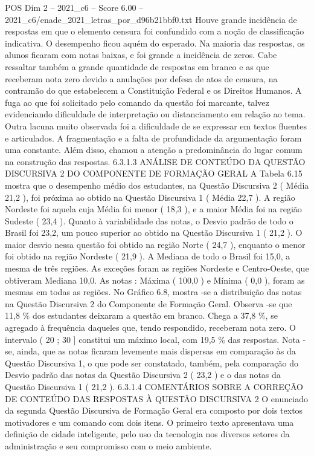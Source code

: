 \begin{textsample}{POS Dim 2 – 2021\_c6 – Score 6.00 – 2021\_c6/enade\_2021\_letras\_por\_d96b21bbf0.txt}
Houve grande incidência de respostas em que o elemento censura foi confundido com a noção de classificação indicativa.
O desempenho ficou aquém do esperado.
Na maioria das respostas, os alunos ficaram com notas baixas, e foi grande a incidência de zeros.
Cabe ressaltar também a grande quantidade de respostas em branco e as que receberam nota zero devido a anulações por defesa de atos de censura, na contramão do que estabelecem a Constituição Federal e os Direitos Humanos.
A fuga ao que foi solicitado pelo comando da questão foi marcante, talvez evidenciando dificuldade de interpretação ou distanciamento em relação ao tema.
Outra lacuna muito observada foi a dificuldade de se expressar em textos fluentes e articulados.
A fragmentação e a falta de profundidade da argumentação foram uma constante.
Além disso, chamou a atenção a predominância do lugar comum na construção das respostas. 6.3.1.3 ANÁLISE DE CONTEÚDO DA QUESTÃO DISCURSIVA 2 DO COMPONENTE DE FORMAÇÃO GERAL A Tabela 6.15 mostra que o desempenho médio dos estudantes, na Questão Discursiva 2 ( Média 21,2 ), foi próxima ao obtido na Questão Discursiva 1 ( Média 22,7 ).
A região Nordeste foi aquela cuja Média foi menor ( 18,3 ), e a maior Média foi na região Sudeste ( 23,4 ).
Quanto à variabilidade das notas, o Desvio padrão de todo o Brasil foi 23,2, um pouco superior ao obtido na Questão Discursiva 1 ( 21,2 ).
O maior desvio nessa questão foi obtido na região Norte ( 24,7 ), enquanto o menor foi obtido na região Nordeste ( 21,9 ).
A Mediana de todo o Brasil foi 15,0, a mesma de três regiões.
As exceções foram as regiões Nordeste e Centro-Oeste, que obtiveram Mediana 10,0.
As notas : Máxima ( 100,0 ) e Mínima ( 0,0 ), foram as mesmas em todas as regiões.
No Gráfico 6.8, mostra -se a distribuição das notas na Questão Discursiva 2 do Componente de Formação Geral.
Observa -se que 11,8 \% dos estudantes deixaram a questão em branco.
Chega a 37,8 \%, se agregado à frequência daqueles que, tendo respondido, receberam nota zero.
O intervalo ( 20 ; 30 ] constitui um máximo local, com 19,5 \% das respostas.
Nota -se, ainda, que as notas ficaram levemente mais dispersas em comparação às da Questão Discursiva 1, o que pode ser constatado, também, pela comparação do Desvio padrão das notas da Questão Discursiva 2 ( 23,2 ) e o das notas da Questão Discursiva 1 ( 21,2 ). 6.3.1.4 COMENTÁRIOS SOBRE A CORREÇÃO DE CONTEÚDO DAS RESPOSTAS À QUESTÃO DISCURSIVA 2 O enunciado da segunda Questão Discursiva de Formação Geral era composto por dois textos motivadores e um comando com dois itens.
O primeiro texto apresentava uma definição de cidade inteligente, pelo uso da tecnologia nos diversos setores da administração e seu compromisso com o meio ambiente.

\end{textsample}
